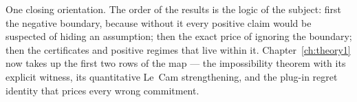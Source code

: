One closing orientation. The order of the results is the logic of the
subject: first the negative boundary, because without it every positive
claim would be suspected of hiding an assumption; then the exact price of
ignoring the boundary; then the certificates and positive regimes that live
within it. Chapter~\ref{ch:theory1} now takes up the first two rows of the
map --- the impossibility theorem with its explicit witness, its
quantitative Le~Cam strengthening, and the plug-in regret identity that
prices every wrong commitment.
